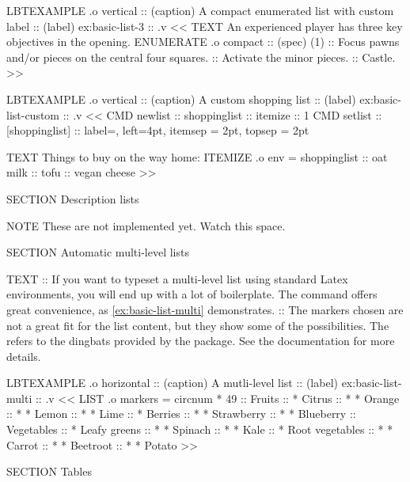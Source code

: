 \begin{lbt}
    LBTEXAMPLE .o vertical
    :: (caption) A compact enumerated list with custom label
    :: (label) ex:basic-list-3
    :: .v <<
      TEXT An experienced player has three key objectives in the opening.
      ENUMERATE .o compact :: (spec) (1)
      :: Focus pawns and/or pieces on the central four squares.
      :: Activate the minor pieces.
      :: Castle.
    >>

    LBTEXAMPLE .o vertical
    :: (caption) A custom shopping list
    :: (label) ex:basic-list-custom
    :: .v <<
      CMD newlist :: shoppinglist :: itemize :: 1
      CMD setlist :: [shoppinglist]
      :: label=, left=4pt, itemsep = 2pt, topsep = 2pt

      TEXT Things to buy on the way home:
      ITEMIZE .o env = shoppinglist
      :: oat milk
      :: tofu
      :: vegan cheese
    >>

    SECTION Description lists

    NOTE These are not implemented yet. Watch this space.

    SECTION Automatic multi-level lists

    TEXT
    :: If you want to typeset a multi-level list using standard Latex environments, you will end up with a lot of boilerplate. The \lbtlogo{} command  offers great convenience, as \cref{ex:basic-list-multi} demonstrates.
    :: The markers chosen are not a great fit for the list content, but they show some of the possibilities. The  refers to the dingbats provided by the  package. See the documentation for more details.

    LBTEXAMPLE .o horizontal
    :: (caption) A mutli-level list
    :: (label) ex:basic-list-multi
    :: .v <<
      LIST .o markers = circnum * 49
      :: Fruits
      :: * Citrus
      :: * * Orange
      :: * * Lemon
      :: * * Lime
      :: * Berries
      :: * * Strawberry
      :: * * Blueberry
      :: Vegetables
      :: * Leafy greens
      :: * * Spinach
      :: * * Kale
      :: * Root vegetables
      :: * * Carrot
      :: * * Beetroot
      :: * * Potato
    >>

    SECTION Tables


\end{lbt}
